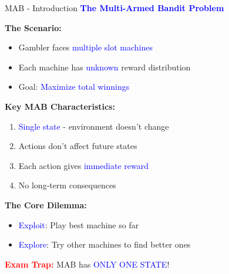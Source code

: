 \documentclass[8pt]{beamer}
\begin{document}
	\begin{frame}{MAB - Introduction}
		\fontsize{6.5}{7.5}\selectfont
		\textcolor{blue}{\textbf{The Multi-Armed Bandit Problem}}
		
		\textbf{The Scenario:}
		\begin{itemize}
			\item Gambler faces \textcolor{blue}{multiple slot machines}
			\item Each machine has \textcolor{blue}{unknown} reward distribution
			\item Goal: \textcolor{blue}{Maximize total winnings}
		\end{itemize}
		
		\textbf{Key MAB Characteristics:}
		\begin{enumerate}
			\item \textcolor{blue}{Single state} - environment doesn't change
			\item Actions don't affect future states
			\item Each action gives \textcolor{blue}{immediate reward}
			\item No long-term consequences
		\end{enumerate}
		
		\textbf{The Core Dilemma:}
		\begin{itemize}
			\item \textcolor{blue}{Exploit}: Play best machine so far
			\item \textcolor{blue}{Explore}: Try other machines to find better ones
		\end{itemize}
		
		\textcolor{red}{\textbf{Exam Trap:}} MAB has \textcolor{blue}{ONLY ONE STATE}!
	\end{frame}
	
\end{document}
